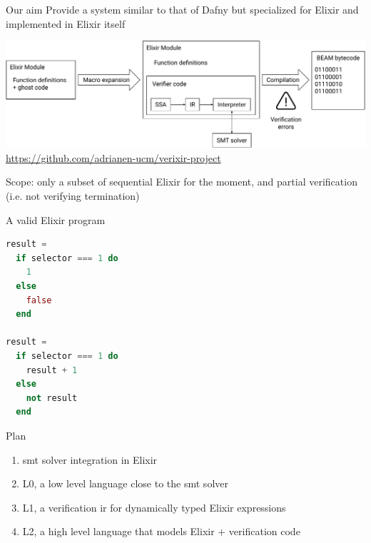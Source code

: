 \documentclass{beamer}
\begin{document}
  \begin{frame}{Our aim}
    Provide a system similar to that of Dafny but specialized for Elixir
    and implemented in Elixir itself

    \pause \bigskip

    \begin{center}
      \includegraphics[width=\textwidth]{Images/Vectorial/Diagram.pdf}
      \url{https://github.com/adrianen-ucm/verixir-project}
    \end{center}
    
    \pause \bigskip

    Scope: only a subset of sequential Elixir for the moment, and partial 
    verification (i.e. not verifying termination)
  \end{frame}
  \begin{frame}[fragile]{A valid Elixir program}
    \small
    \begin{lstlisting}[language=elixir,numbers=none,frame=none]
result =
  if selector === 1 do
    1
  else
    false
  end

result =
  if selector === 1 do
    result + 1
  else
    not result
  end
    \end{lstlisting}
  \end{frame}
  \begin{frame}{Plan}

    \begin{enumerate}
      \item \pause \acrshort*{smt} solver integration in Elixir
      \item \pause L0, a low level language close to the \acrshort*{smt} solver
      \item \pause L1, a verification \gls*{ir} for dynamically typed Elixir expressions
      \item \pause L2, a high level language that models Elixir + verification code
    \end{enumerate}
  \end{frame}
\end{document}
